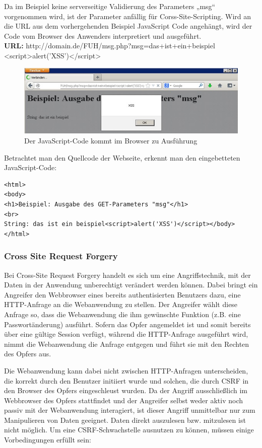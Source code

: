 Da im Beispiel keine serverseitige Validierung des Parameters „msg“ vorgenommen wird, ist der Parameter anfällig für Corss-Site-Scripting.
Wird an die URL aus dem vorhergehenden Beispiel JavaScript Code angehängt, wird der Code vom Browser des Anwenders interpretiert und ausgeführt.
\\
\textbf{URL:} http://domain.de/FUH/msg.php?msg=das+ist+ein+beispiel\\<script>alert('XSS')</script>

\begin{figure}[htbp]
 \centering
 \includegraphics[scale=.75]{abbildungen/xss_2}
 \caption{Der JavaScript-Code kommt im Browser zu Ausführung}
 \label{fig:xss_1} 
\end{figure}

Betrachtet man den Quellcode der Webseite, erkennt man den eingebetteten JavaScript-Code:

\begin{lstlisting}[basicstyle=\ttfamily\footnotesize]
<html>
<body>
<h1>Beispiel: Ausgabe des GET-Parameters "msg"</h1>
<br>
String: das ist ein beispiel<script>alert('XSS')</script></body>
</html>
\end{lstlisting}

\subsubsection{Cross Site Request Forgery}
Bei Cross-Site Request Forgery handelt es sich um eine Angriffstechnik, mit der Daten in der Anwendung unberechtigt verändert werden können. Dabei bringt ein Angreifer den Webbrowser eines bereits authentisierten Benutzers dazu, eine HTTP-Anfrage an die Webanwendung zu stellen. Der Angreifer wählt diese Anfrage so, dass die Webanwendung die ihm gewünschte Funktion (z.B. eine Passwortänderung) ausführt. Sofern das Opfer angemeldet ist und somit bereits über eine gültige Session verfügt, während die HTTP-Anfrage ausgeführt wird, nimmt die Webanwendung die Anfrage entgegen und führt sie mit den Rechten des Opfers aus.

Die Webanwendung kann dabei nicht zwischen HTTP-Anfragen unterscheiden, die korrekt durch den Benutzer initiiert wurde und solchen, die durch CSRF in den Browser des Opfers eingeschleust wurden. Da der Angriff ausschließlich im Webbrowser des Opfers stattfindet und der Angreifer selbst weder aktiv noch passiv mit der Webanwendung interagiert, ist dieser Angriff unmittelbar nur zum Manipulieren von Daten geeignet. Daten direkt auszulesen bzw. mitzulesen ist nicht möglich. Um eine CSRF-Schwachstelle ausnutzen zu können, müssen einige Vorbedingungen erfüllt sein:


